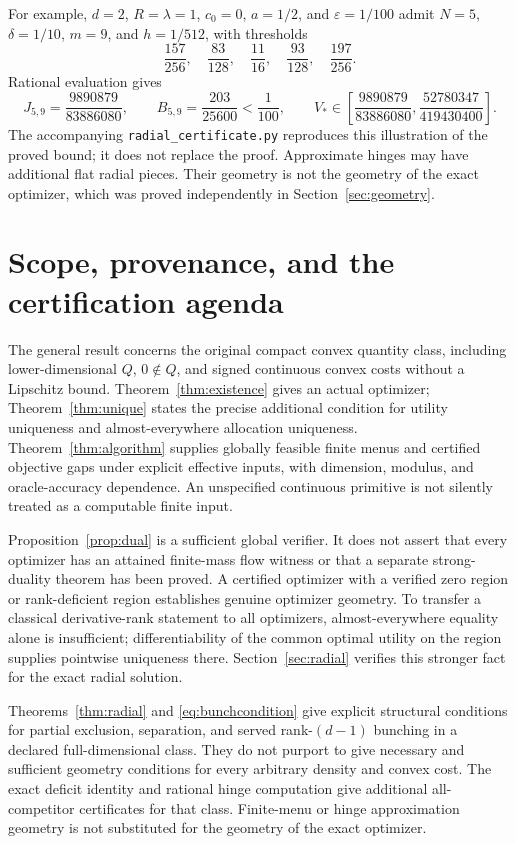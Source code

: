 \documentclass[11pt,a4paper]{article}
\numberwithin{equation}{section}
\begin{document}
For example, \(d=2\), \(R=\lambda=1\), \(c_0=0\), \(a=1/2\), and
\(\varepsilon=1/100\) admit \(N=5\), \(\delta=1/10\), \(m=9\),
and \(h=1/512\), with thresholds
\[
 \frac{157}{256},\quad\frac{83}{128},\quad\frac{11}{16},
 \quad\frac{93}{128},\quad\frac{197}{256}.
\]
Rational evaluation gives
\[
 J_{5,9}=\frac{9890879}{83886080},\qquad
 B_{5,9}=\frac{203}{25600}<\frac1{100},\qquad
 V_*\in\left[\frac{9890879}{83886080},
             \frac{52780347}{419430400}\right].
\]
The accompanying \texttt{radial\_certificate.py} reproduces this
illustration of the proved bound; it does not replace the proof.
Approximate hinges may have additional flat radial pieces.
Their geometry is not the geometry of the exact optimizer, which was
proved independently in Section~\ref{sec:geometry}.

\section{Scope, provenance, and the certification agenda}\label{sec:scope}
The general result concerns the original compact convex quantity class,
including lower-dimensional \(Q\), \(0\notin Q\), and signed continuous
convex costs without a Lipschitz bound.
Theorem~\ref{thm:existence} gives an actual optimizer;
Theorem~\ref{thm:unique} states the precise additional condition for
utility uniqueness and almost-everywhere allocation uniqueness.
Theorem~\ref{thm:algorithm} supplies globally feasible finite menus
and certified objective gaps under explicit effective inputs, with
dimension, modulus, and oracle-accuracy dependence.
An unspecified continuous primitive is not silently treated as
a computable finite input.

Proposition~\ref{prop:dual} is a sufficient global verifier.
It does not assert that every optimizer has an attained finite-mass
flow witness or that a separate strong-duality theorem has been proved.
A certified optimizer with a verified zero region or rank-deficient
region establishes genuine optimizer geometry.
To transfer a classical derivative-rank statement to all optimizers,
almost-everywhere equality alone is insufficient; differentiability
of the common optimal utility on the region supplies pointwise
uniqueness there. Section~\ref{sec:radial} verifies this stronger fact
for the exact radial solution.

Theorems~\ref{thm:radial} and \eqref{eq:bunchcondition} give explicit
structural conditions for partial exclusion, separation, and served
rank-\((d-1)\) bunching in a declared full-dimensional class.
They do not purport to give necessary and sufficient geometry conditions
for every arbitrary density and convex cost.
The exact deficit identity and rational hinge computation give
additional all-competitor certificates for that class.
Finite-menu or hinge approximation geometry is not substituted for
the geometry of the exact optimizer.
\end{document}

